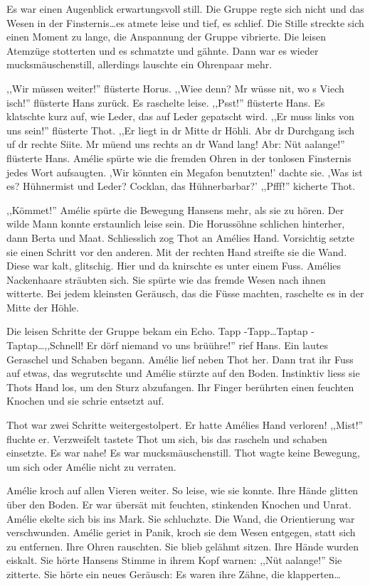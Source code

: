 \documentclass[11pt,titlepage,a5paper]{book}
\newcommand{\am}{Amélie }
\begin{document}
Es war einen Augenblick erwartungsvoll still. Die Gruppe regte sich nicht und das Wesen in der Finsternis\dots es atmete leise und tief, es schlief. Die Stille streckte sich einen Moment zu lange, die Anspannung der Gruppe vibrierte. Die leisen Atemzüge stotterten und es schmatzte und gähnte. Dann war es wieder mucksmäuschenstill, allerdings lauschte ein Ohrenpaar mehr.

,,Wir müssen weiter!'' flüsterte Horus. ,,Wiee denn? Mr wüsse nit, wo s Viech isch!'' flüsterte Hans zurück.  Es raschelte leise. ,,Psst!'' flüsterte Hans. Es klatschte kurz auf, wie Leder, das auf Leder gepatscht wird. ,,Er muss links von uns sein!'' flüsterte Thot. ,,Er liegt in dr Mitte dr Höhli. Abr dr Durchgang isch uf dr rechte Siite. Mr müend uns rechts an dr Wand lang! Abr: Nüt aalange!'' flüsterte Hans. Amélie spürte wie die fremden Ohren in der tonlosen Finsternis jedes Wort aufsaugten. ,Wir könnten ein Megafon benutzten!' dachte sie. ,Was ist es? Hühnermist und Leder? Cocklan, das Hühnerbarbar?' ,,Pfff!'' kicherte Thot.

,,Kömmet!'' Amélie spürte die Bewegung Hansens mehr, als sie zu hören. Der wilde Mann konnte erstaunlich leise sein. Die Horussöhne schlichen hinterher, dann Berta und Maat. Schliesslich zog Thot an Amélies Hand. Vorsichtig setzte sie einen Schritt vor den anderen.  Mit der rechten Hand streifte sie die Wand. Diese war kalt, glitschig. Hier und da knirschte es unter einem Fuss. Amélies Nackenhaare sträubten sich. Sie spürte wie das fremde Wesen nach ihnen witterte. Bei jedem kleinsten Geräusch, das die Füsse machten, raschelte es in der Mitte der Höhle.

Die leisen Schritte der Gruppe bekam ein Echo. Tapp -Tapp\dots Taptap -Taptap\dots ,,Schnell! Er dörf niemand vo uns brüühre!'' rief Hans. Ein lautes Geraschel und Schaben begann. Amélie lief neben Thot her. Dann trat ihr Fuss auf etwas, das wegrutschte und Amélie stürzte auf den Boden. Instinktiv liess sie Thots Hand los, um den Sturz abzufangen. Ihr Finger berührten einen feuchten Knochen und sie schrie entsetzt auf. 

Thot war zwei Schritte weitergestolpert. Er hatte Amélies Hand verloren! ,,Mist!'' fluchte er. Verzweifelt tastete Thot um sich, bis das rascheln und schaben einsetzte. Es war nahe! Es war mucksmäuschenstill. Thot wagte keine Bewegung, um sich oder \am nicht zu verraten. 

Amélie kroch auf allen Vieren weiter. So leise, wie sie konnte. Ihre Hände glitten über den Boden. Er war übersät mit feuchten, stinkenden Knochen und Unrat. Amélie ekelte sich bis ins Mark. Sie schluchzte. Die Wand, die Orientierung war verschwunden. \am geriet in Panik, kroch sie dem Wesen entgegen, statt sich zu entfernen. Ihre Ohren rauschten. Sie blieb gelähmt sitzen. Ihre Hände wurden eiskalt. Sie hörte Hansens Stimme in ihrem Kopf warnen: ,,Nüt aalange!'' Sie zitterte. Sie hörte ein neues Geräusch: Es waren ihre Zähne, die klapperten\dots  
\end{document}
